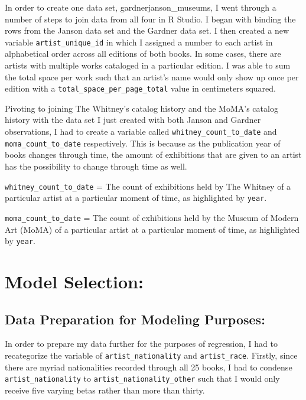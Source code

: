 \documentclass[
  letterpaper,
  DIV=11,
  numbers=noendperiod]{scrreprt}
\begin{document}
In order to create one data set, gardnerjanson\_museums, I went through
a number of steps to join data from all four in R Studio. I began with
binding the rows from the Janson data set and the Gardner data set. I
then created a new variable \texttt{artist\_unique\_id} in which I
assigned a number to each artist in alphabetical order across all
editions of both books. In some cases, there are artists with multiple
works cataloged in a particular edition. I was able to sum the total
space per work such that an artist's name would only show up once per
edition with a \texttt{total\_space\_per\_page\_total} value in
centimeters squared.

Pivoting to joining The Whitney's catalog history and the MoMA's catalog
history with the data set I just created with both Janson and Gardner
observations, I had to create a variable called
\texttt{whitney\_count\_to\_date} and \texttt{moma\_count\_to\_date}
respectively. This is because as the publication year of books changes
through time, the amount of exhibitions that are given to an artist has
the possibility to change through time as well.

\texttt{whitney\_count\_to\_date} = The count of exhibitions held by The
Whitney of a particular artist at a particular moment of time, as
highlighted by \texttt{year}.

\texttt{moma\_count\_to\_date} = The count of exhibitions held by the
Museum of Modern Art (MoMA) of a particular artist at a particular
moment of time, as highlighted by \texttt{year}.

\hypertarget{model-selection}{%
\section{Model Selection:}\label{model-selection}}

\hypertarget{data-preparation-for-modeling-purposes}{%
\subsection{Data Preparation for Modeling
Purposes:}\label{data-preparation-for-modeling-purposes}}

In order to prepare my data further for the purposes of regression, I
had to recategorize the variable of \texttt{artist\_nationality} and
\texttt{artist\_race}. Firstly, since there are myriad nationalities
recorded through all 25 books, I had to condense
\texttt{artist\_nationality} to \texttt{artist\_nationality\_other} such
that I would only receive five varying betas rather than more than
thirty.
\end{document}
